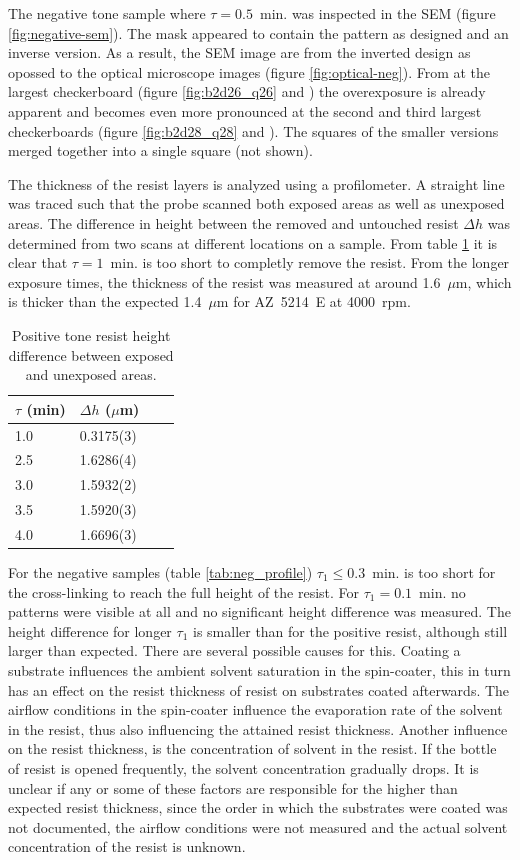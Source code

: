 The negative tone sample where $\tau = 0.5$~min. was inspected in the SEM (figure \ref{fig:negative-sem}). The mask appeared to contain the pattern as designed and an inverse version. As a result, the SEM image are from the inverted design as opossed to the optical microscope images (figure \ref{fig:optical-neg}). From at the largest checkerboard (figure \ref{fig:b2d26_q26} and ) the overexposure is already apparent and becomes even more pronounced at the second and third largest checkerboards (figure \ref{fig:b2d28_q28} and ). The squares of the smaller versions merged together into a single square (not shown).

The thickness of the resist layers is analyzed using a profilometer. A straight line was traced such that the probe scanned both exposed areas as well as  unexposed areas. The difference in height between the removed and untouched resist $\Delta h$ was determined from two scans at different locations on a sample. From table \ref{tab:pos_profile} it is clear that $\tau = 1$~min. is too short to completly remove the resist. From the longer exposure times, the thickness of the resist was measured at around 1.6~$\mu$m, which is thicker than the expected 1.4~$\mu$m for AZ~5214~E at 4000~rpm.
\begin{table}[H]
    \centering
    \caption{Positive tone resist height difference between exposed and unexposed areas.}
    \begin{tabular}{X l l l}
        $\tau$ (min)& $\Delta h$ ($\mu$m) \\
        \hline\hline
        1.0 & 0.3175(3) \\
        2.5 & 1.6286(4) \\
        3.0 & 1.5932(2) \\
        3.5 & 1.5920(3) \\
        4.0 & 1.6696(3) \\
        \hline
    \end{tabular}
    \label{tab:pos_profile}
\end{table} For the negative samples (table \ref{tab:neg_profile}) $\tau_1 \leq 0.3$~min. is too short for the cross-linking to reach the full height of the resist. For $\tau_1 = 0.1$~min. no patterns were visible at all and no significant height difference was measured. The height difference for longer $\tau_1$ is smaller than for the positive resist, although still larger than expected. There are several possible causes for this. Coating a substrate influences the ambient solvent saturation in the spin-coater, this in turn has an effect on the resist thickness of resist on substrates coated afterwards. The airflow conditions in the spin-coater influence the evaporation rate of the solvent in the resist, thus also influencing the attained resist thickness. Another influence on the resist thickness, is the concentration of solvent in the resist. If the bottle of resist is opened frequently, the solvent concentration gradually drops. It is unclear if any or some of these factors are responsible for the higher than expected resist thickness, since the order in which the substrates were coated was not documented, the airflow conditions were not measured and the actual solvent concentration of the resist is unknown.
